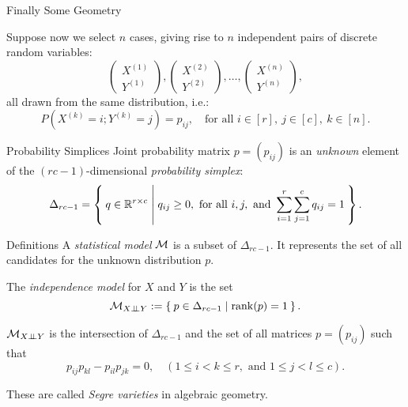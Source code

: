 \begin{frame}{Finally Some Geometry}

    Suppose now we select $n$ cases, giving rise to $n$ independent pairs of discrete random variables:
    $$ \begin{pmatrix} X^{(1)} \\ Y^{(1)} \end{pmatrix}, \begin{pmatrix} X^{(2)} \\ Y^{(2)} \end{pmatrix}, \ldots, \begin{pmatrix} X^{(n)} \\ Y^{(n)} \end{pmatrix}, $$
    all drawn from the same distribution, i.e.:
    $$ P( X^{(k)} = i; Y^{(k)} = j ) = p_{ij}, \quad \text{for all } i \in [r],\ j \in [c],\ k \in [n]. $$

    \begin{block}{Probability Simplices}
    Joint probability matrix $p = (p_{ij})$ is an \emph{unknown} element of the $(rc-1)$-dimensional \emph{probability simplex}:
    $$ \Delta_{rc-1} = \Set{ q \in \mathbb{R}^{r\times c} | q_{ij} \geq 0, \text{ for all } i,j, \text{ and } \sum_{i = 1}^{r}\sum_{j = 1}^{c} q_{ij} = 1 }. $$
    \end{block}

\end{frame}

\begin{frame}

    \begin{block}{Definitions}
        A \emph{statistical model} $\mathcal{M}$ is a subset of $\Delta_{rc-1}$. It represents the set of all candidates for the unknown distribution $p$.

        The \emph{independence model} for $X$ and $Y$ is the set
        $$ \mathcal{M}_{X \perp \!\!\! \perp Y} := \Set{ p \in \Delta_{rc - 1} | \rank(p) = 1 }. $$
    \end{block}

    $\mathcal{M}_{X \perp \!\!\! \perp Y}$ is the intersection of $\Delta_{rc-1}$ and the set of all matrices $p = (p_{ij})$ such that
    $$ p_{ij}p_{kl} - p_{il}p_{jk} = 0, \quad (1 \leq i < k \leq r, \text{ and } 1 \leq j < l \leq c). $$

    These are called \emph{Segre varieties} in algebraic geometry.

\end{frame}
